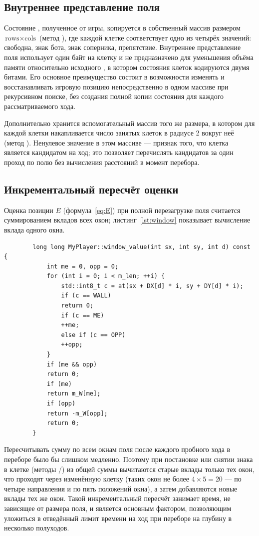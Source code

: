 \documentclass[14pt,a4paper]{extarticle}
\begin{document}
	\subsection{Внутреннее представление поля}
	
	Состояние , полученное от игры, копируется в собственный массив  размером $\text{rows}\times\text{cols}$ (метод ), где каждой клетке соответствует одно из четырёх значений: свободна, знак бота, знак соперника, препятствие. Внутреннее представление поля использует один байт на клетку и не предназначено для уменьшения объёма памяти относительно исходного , в котором состояния клеток кодируются двумя битами. Его основное преимущество состоит в возможности изменять и восстанавливать игровую позицию непосредственно в одном массиве при рекурсивном поиске, без создания полной копии состояния для каждого рассматриваемого хода.
	
	Дополнительно хранится вспомогательный массив  того же размера, в котором для каждой клетки накапливается число занятых клеток в радиусе 2 вокруг неё (метод ). Ненулевое значение в этом массиве --- признак того, что клетка является кандидатом на ход; это позволяет перечислять кандидатов за один проход по полю без вычисления расстояний в момент перебора.
	
	\subsection{Инкрементальный пересчёт оценки}
	
	Оценка позиции $E$ (формула~\eqref{eq:E}) при полной перезагрузке поля считается суммированием вкладов всех окон; листинг~\ref{lst:window} показывает вычисление вклада одного окна.
	
	\label{lst:window}
	\begin{verbatim}
		long long MyPlayer::window_value(int sx, int sy, int d) const {
			int me = 0, opp = 0;
			for (int i = 0; i < m_len; ++i) {
				std::int8_t c = at(sx + DX[d] * i, sy + DY[d] * i);
				if (c == WALL)
				return 0;
				if (c == ME)
				++me;
				else if (c == OPP)
				++opp;
			}
			if (me && opp)
			return 0;
			if (me)
			return m_W[me];
			if (opp)
			return -m_W[opp];
			return 0;
		}
	\end{verbatim}
	
	Пересчитывать сумму по всем окнам поля после каждого пробного хода в переборе было бы слишком медленно. Поэтому при постановке или снятии знака в клетке (методы /) из общей суммы вычитаются старые вклады только тех окон, что проходят через изменённую клетку (таких окон не более $4\times 5=20$ --- по четыре направления и по пять положений окна), а затем добавляются новые вклады тех же окон. Такой инкрементальный пересчёт занимает время, не зависящее от размера поля, и является основным фактором, позволяющим уложиться в отведённый лимит времени на ход при переборе на глубину в несколько полуходов.
	
\end{document}
